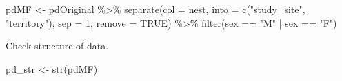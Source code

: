 \documentclass[
]{article}
\newenvironment{Shaded}{\begin{snugshade}}{\end{snugshade}}
\newcommand{\AttributeTok}[1]{\textcolor[rgb]{0.77,0.63,0.00}{#1}}
\newcommand{\ConstantTok}[1]{\textcolor[rgb]{0.00,0.00,0.00}{#1}}
\newcommand{\DecValTok}[1]{\textcolor[rgb]{0.00,0.00,0.81}{#1}}
\newcommand{\FunctionTok}[1]{\textcolor[rgb]{0.00,0.00,0.00}{#1}}
\newcommand{\NormalTok}[1]{#1}
\newcommand{\OtherTok}[1]{\textcolor[rgb]{0.56,0.35,0.01}{#1}}
\newcommand{\SpecialCharTok}[1]{\textcolor[rgb]{0.00,0.00,0.00}{#1}}
\newcommand{\StringTok}[1]{\textcolor[rgb]{0.31,0.60,0.02}{#1}}
\begin{document}
\begin{Shaded}
\begin{Highlighting}[]
\NormalTok{pdMF }\OtherTok{\textless{}{-}}\NormalTok{ pdOriginal }\SpecialCharTok{\%\textgreater{}\%}
  \FunctionTok{separate}\NormalTok{(}\AttributeTok{col =}\NormalTok{ nest, }\AttributeTok{into =} \FunctionTok{c}\NormalTok{(}\StringTok{"study\_site"}\NormalTok{, }\StringTok{"territory"}\NormalTok{), }\AttributeTok{sep =} \DecValTok{1}\NormalTok{, }\AttributeTok{remove =} \ConstantTok{TRUE}\NormalTok{) }\SpecialCharTok{\%\textgreater{}\%}
  \FunctionTok{filter}\NormalTok{(sex }\SpecialCharTok{==} \StringTok{"M"} \SpecialCharTok{|}\NormalTok{ sex }\SpecialCharTok{==} \StringTok{"F"}\NormalTok{)}
\end{Highlighting}
\end{Shaded}

Check structure of data.

\begin{Shaded}
\begin{Highlighting}[]
\NormalTok{pd\_str }\OtherTok{\textless{}{-}} \FunctionTok{str}\NormalTok{(pdMF)}
\end{Highlighting}
\end{Shaded}
\end{document}
